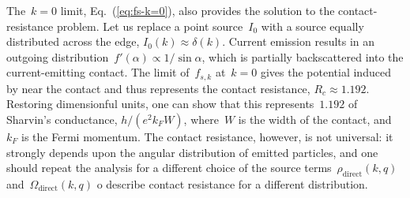 \documentclass[preprint,aps,eqsecnum]{revtex4-1}
\newcommand{\dct}[1]{{#1}_\mathrm{direct}}
\begin{document}
The~$k = 0$ limit, Eq.~(\ref{eq:fs-k=0}), also provides the solution
to the contact-resistance problem. Let us replace a point source~$I_0$
with  a source equally distributed across the edge,
$I_0(k) \approx \delta(k)$. Current emission results in
an outgoing distribution~$f'(\alpha) \propto 1/\sin\alpha$,
which is partially backscattered into the current-emitting contact.
The limit of~$f_{s, k}$ at~$k = 0$ gives the potential induced by
near the contact and thus represents the contact resistance,
$R_c \approx 1.192$. Restoring  dimensionful units, one can show
that this represents~$1.192$ of Sharvin's conductance, $h/(e^2 k_F W)$,
where~$W$ is the width of the contact, and~$k_F$ is the Fermi momentum.
The contact resistance, however, is not universal:
it strongly depends upon the angular distribution
of emitted particles, and one should repeat the analysis for a different
choice of the source terms~$\dct{\rho}(k, q)$ and~$\dct{\Omega}(k, q)$
o describe contact resistance for a different distribution.

\end{document}
